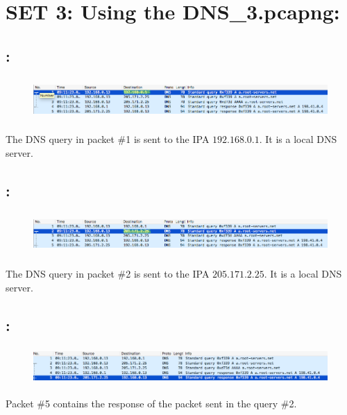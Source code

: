 \documentclass[]{report}
\begin{document}

\section{SET 3: Using the DNS\_3.pcapng:}

\subsection{:}
\begin{figure}[H]
	\vspace{0pt}
	\includegraphics[height = 45pt, keepaspectratio]{Snapshots/q3/3_1.png}
\end{figure}
The DNS query in packet \#1 is sent to the IPA $192.168.0.1$. It is a local DNS server.

\subsection{:}
\begin{figure}[H]
	\vspace{0pt}
	\includegraphics[height = 45pt, keepaspectratio]{Snapshots/q3/3_2.png}
\end{figure}
The DNS query in packet \#2 is sent to the IPA $205.171.2.25$. It is a local DNS server.


\subsection{:}
\begin{figure}[H]
	\vspace{0pt}
	\includegraphics[height = 40pt, keepaspectratio]{Snapshots/q3/3_3_1.png}
\end{figure}

Packet \#5 contains the response of the packet sent in the query \#2.
\end{document}
